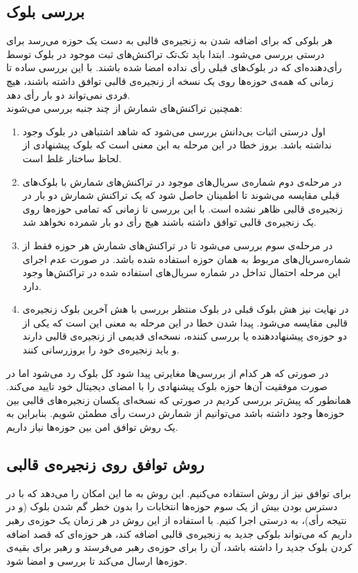 \subsection{بررسی بلوک}
هر بلوکی که برای اضافه شدن به زنجیره‌ی قالبی به دست یک حوزه می‌رسد برای درستی بررسی می‌شود. ابتدا باید تک‌‌تک تراکنش‌های ثبت موجود در بلوک توسط رأی‌دهنده‌‌ای که در بلوک‌های قبلی رأی‌ نداده امضا شده باشند. با این بررسی ساده تا زمانی که همه‌ی حوزه‌ها روی یک نسخه از زنجیره‌ی قالبی توافق داشته باشند، هیچ فردی نمی‌تواند دو بار رأی ‌دهد.
\\
همچنین تراکنش‌های شمارش از چند جنبه بررسی می‌شوند:
	\begin{enumerate}
		\item 
		اول درستی اثبات‌ بی‌دانش بررسی می‌شود که شاهد اشتباهی در بلوک وجود نداشته باشد. بروز خطا در این مرحله به این معنی است که بلوک پیشنهادی از لحاظ ساختار غلط است.
		\item 
		در مرحله‌ی دوم شماره‌ی سریال‌های موجود در تراکنش‌های شمارش با بلوک‌های قبلی مقایسه می‌شوند تا اطمینان حاصل شود که یک تراکنش شمارش دو بار در زنجیره‌ی قالبی ظاهر نشده است. با این بررسی تا زمانی که تمامی حوزه‌ها روی یک زنجیره‌ی قالبی توافق داشته ‌باشند هیچ رأی دو بار شمرده نخواهد شد.
		\item 
		در مرحله‌ی سوم بررسی می‌شود تا در تراکنش‌های شمارش هر حوزه فقط از شماره‌سریال‌های مربوط به همان حوزه استفاده شده باشد. در صورت عدم اجرای این مرحله احتمال تداخل در شماره سریال‌های استفاده شده در تراکنش‌ها وجود دارد.
		\item 
		در نهایت نیز هش بلوک قبلی در بلوک منتظر بررسی با هش آخرین بلوک زنجیره‌ی قالبی مقایسه می‌شود. پیدا شدن خطا در این مرحله به معنی این است که یکی از دو حوزه‌ی پیشنهاددهنده یا بررسی کننده، نسخه‌ای قدیمی از زنجیره‌ی قالبی دارند و باید زنجیره‌ی خود را بروزرسانی کنند.
		
	\end{enumerate}

\par
 در صورتی که هر کدام از بررسی‌ها مغایرتی پیدا شود کل بلوک رد می‌شود اما در صورت موفقیت آن‌ها حوزه بلوک پیشنهادی را با امضای دیجیتال خود تایید می‌کند. همانطور که پیش‌تر بررسی کردیم در صورتی که نسخه‌ای یکسان زنجیره‌های قالبی بین حوزه‌ها وجود داشته باشد می‌توانیم از شمارش درست رأی مطمئن شویم. بنابراین به یک روش توافق امن بین حوزه‌ها نیاز داریم.


\subsection{روش توافق روی زنجیره‌ی قالبی}
برای توافق نیز از روش  استفاده می‌کنیم. این روش به ما این امکان را می‌دهد که با در دسترس بودن بیش از یک سوم حوزه‌ها انتخابات را بدون خطر گم شدن بلوک (و در نتیجه رأی)، به درستی اجرا کنیم. با استفاده از این روش در هر زمان یک حوزه‌ی رهبر داریم که می‌تواند بلوکی جدید به زنجیره‌ی قالبی اضافه کند، هر حوزه‌ای که قصد اضافه کردن بلوک جدید را داشته باشد، آن را برای حوزه‌ی رهبر می‌فرستد و رهبر برای بقیه‌ی حوزه‌ها ارسال می‌کند تا بررسی و امضا شود. 

